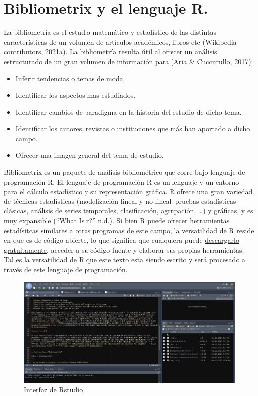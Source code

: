 \documentclass[
]{article}
\providecommand{\tightlist}{%
  \setlength{\itemsep}{0pt}\setlength{\parskip}{0pt}}
\begin{document}
\hypertarget{bibliometrix-y-el-lenguaje-r.}{%
\section{Bibliometrix y el lenguaje
R.}\label{bibliometrix-y-el-lenguaje-r.}}

La bibliometría es el estudio matemático y estadístico de las distintas
características de un volumen de artículos académicos, libros etc
(Wikipedia contributors, 2021a). La bibliometría resulta útil al ofrecer
un análisis estructurado de un gran volumen de información para (Aria \&
Cuccurullo, 2017):

\begin{itemize}
\tightlist
\item
  Inferir tendencias o temas de moda.
\item
  Identificar los aspectos mas estudiados.
\item
  Identificar cambios de paradigma en la historia del estudio de dicho
  tema.
\item
  Identificar los autores, revistas o instituciones que más han aportado
  a dicho campo.
\item
  Ofrecer una imagen general del tema de estudio.
\end{itemize}

Bibliometrix es un paquete de análisis bibliométrico que corre bajo
lenguaje de programación R. El lenguaje de programación R es un lenguaje
y un entorno para el cálculo estadístico y su representación gráfica. R
ofrece una gran variedad de técnicas estadísticas (modelización lineal y
no lineal, pruebas estadísticas clásicas, análisis de series temporales,
clasificación, agrupación, \ldots) y gráficas, y es muy expansible
({``What Is r?''} n.d.). Si bien R puede ofrecer herramientas
estadísitcas similares a otros programas de este campo, la versatilidad
de R reside en que es de código abierto, lo que significa que cualquiera
puede
\href{https://www.rstudio.com/products/rstudio/download/}{descargarlo
gratuitamente}, acceder a su código fuente y elaborar sus propias
herramientas. Tal es la versatilidad de R que este texto esta siendo
escrito y será procesado a través de este lenguaje de programación.

\begin{figure}
\centering
\includegraphics{rstudiointerfaz.JPG}
\caption{Interfaz de Rstudio}
\end{figure}
\end{document}
